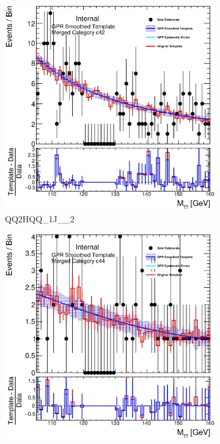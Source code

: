 \begin{figure} 
\begin{center}
\begin{subfigure}[T]{0.49\linewidth}
	\centering
	\includegraphics[width=\linewidth]{figures/background/gpr/coupCatTemplates/GPR_Smoothed_Plot_hmgg_c42.eps}
	\caption{QQ2HQQ\_1J\_\_2}
\end{subfigure}
\begin{subfigure}[T]{0.49\linewidth}
	\centering
	\includegraphics[width=\linewidth]{figures/background/gpr/coupCatTemplates/GPR_Smoothed_Plot_hmgg_c44.eps}

\end{subfigure}
\end{center}
\end{figure}
